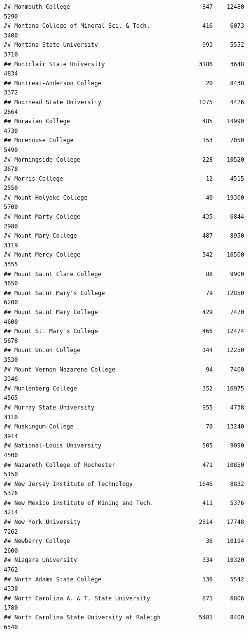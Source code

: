 \documentclass[
]{article}
\begin{document}
\begin{verbatim}
## Monmouth College                                      847    12480       5290
## Montana College of Mineral Sci. & Tech.               416     6073       3400
## Montana State University                              993     5552       3710
## Montclair State University                           3186     3648       4834
## Montreat-Anderson College                              20     8438       3372
## Moorhead State University                            1075     4426       2664
## Moravian College                                      485    14990       4730
## Morehouse College                                     153     7050       5490
## Morningside College                                   228    10520       3678
## Morris College                                         12     4515       2550
## Mount Holyoke College                                  40    19300       5700
## Mount Marty College                                   435     6844       2980
## Mount Mary College                                    487     8950       3119
## Mount Mercy College                                   542    10500       3555
## Mount Saint Clare College                              88     9900       3650
## Mount Saint Mary's College                             79    12850       6200
## Mount Saint Mary College                              429     7470       4600
## Mount St. Mary's College                              466    12474       5678
## Mount Union College                                   144    12250       3530
## Mount Vernon Nazarene College                          94     7400       3346
## Muhlenberg College                                    352    16975       4565
## Murray State University                               955     4738       3110
## Muskingum College                                      70    13240       3914
## National-Louis University                             505     9090       4500
## Nazareth College of Rochester                         471    10850       5150
## New Jersey Institute of Technology                   1646     8832       5376
## New Mexico Institute of Mining and Tech.              411     5376       3214
## New York University                                  2814    17748       7262
## Newberry College                                       36    10194       2600
## Niagara University                                    334    10320       4762
## North Adams State College                             136     5542       4330
## North Carolina A. & T. State University               871     6806       1780
## North Carolina State University at Raleigh           5481     8400       6540

\end{verbatim}
\end{document}
